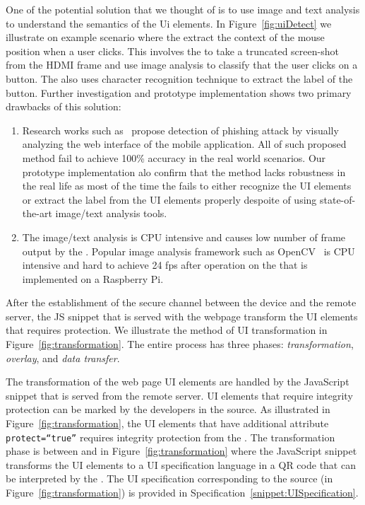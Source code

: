  One of the potential solution that we thought of is to use image and text analysis to understand the semantics of the Ui elements. In Figure~\ref{fig:uiDetect} we illustrate on example scenario where the \device extract the context of the mouse position when a user clicks. This involves the \device to take a truncated screen-shot from the HDMI frame and use image analysis to classify that the user clicks on a button. The \device also uses character recognition technique to extract the label of the button. Further investigation and prototype implementation shows two primary drawbacks of this solution:
\begin{enumerate}
  \item Research works such as~\cite{lukaSpoof,Chen:2010:DVS:1754393.1754394} propose detection of phishing attack by visually analyzing the web interface of the mobile application. All of such proposed method fail to achieve 100\% accuracy in the real world scenarios. Our prototype implementation alo confirm that the method lacks robustness in the real life as most of the time the \device fails to either recognize the UI elements or extract the label from the UI elements properly despoite of using state-of-the-art image/text analysis tools.
  \item The image/text analysis is CPU intensive and causes low number of frame output by the \device. Popular image analysis framework such as OpenCV~\cite{opencv} is CPU intensive and hard to achieve 24 fps after operation on the \device that is implemented on a Raspberry Pi.
\end{enumerate}


 After the establishment of the secure channel between the device and the remote server, the \name JS snippet that is served with the webpage transform the UI elements that requires protection. We illustrate the method of UI transformation in Figure~\ref{fig:transformation}. The entire process has three phases: \emph{transformation}, \emph{overlay}, and \emph{data transfer}.

 The transformation of the web page UI elements are handled by the \name JavaScript snippet that is served from the remote server. UI elements that require integrity protection can be marked by the developers in the \html source. As illustrated in Figure~\ref{fig:transformation}, the \html UI elements that have additional attribute \texttt{protect=``true''} requires integrity protection from the \device. The transformation phase is between \one and \two in Figure~\ref{fig:transformation} where the \name JavaScript snippet transforms the UI elements to a UI specification language in a QR code that can be interpreted by the \device. The UI specification corresponding to the \html source (in Figure~\ref{fig:transformation}) is provided in Specification~\ref{snippet:UISpecification}.


